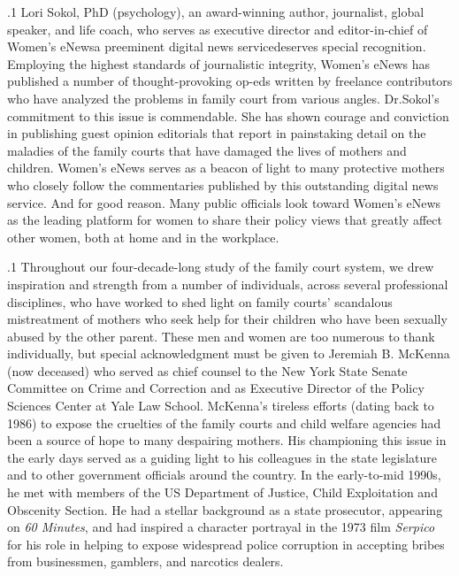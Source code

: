 \documentclass[11pt, twoside]{article}
\begin{document}
{\p.1{%
Lori Sokol, PhD (psychology), an award-winning author, journalist,
global speaker, and life coach, who serves as executive director
and editor-in-chief of Women’s eNews\mdash{}a preeminent digital news
service\mdash{}deserves special recognition. Employing the highest standards
of journalistic integrity, Women’s eNews has published a number of
thought-provoking op-eds written by freelance contributors who have
analyzed the problems in family court from various angles. Dr.\@ Sokol’s
commitment to this issue is commendable. She has shown courage and
conviction in publishing guest opinion editorials that report in painstaking detail on the maladies of the family courts that have damaged the
lives of mothers and children. Women’s eNews serves as a beacon of
light to many protective mothers who closely follow the commentaries
published by this outstanding digital news service. And for good reason. Many public officials look toward Women’s eNews as the leading
platform for women to share their policy views that greatly affect other
women, both at home and in the workplace.
}%

\p.1{%
Throughout our four-decade-long study of the family court
system, we drew inspiration and strength from a number of individuals, across several professional disciplines, who have worked to shed
light on family courts’ scandalous mistreatment of mothers who seek
help for their children who have been sexually abused by the other parent. These men and women are too numerous to thank individually,
but special acknowledgment must be given to Jeremiah B. McKenna
(now deceased) who served as chief counsel to the New York
State Senate Committee on Crime and Correction and as Executive Director of the Policy Sciences Center at Yale Law School. McKenna’s tireless
efforts (dating back to 1986) to expose the cruelties of the family courts
and child welfare agencies had been a source of hope to many despairing mothers. His championing this issue in the early days served as
a guiding light to his colleagues in the state legislature and to other
government officials around the country. In the early-to-mid 1990s, he
met with members of the US Department of Justice, Child Exploitation
and Obscenity Section. He had a stellar background as a state prosecutor,
appearing on \textit{60 Minutes}, and had inspired a character portrayal in the 1973 film
\textit{Serpico} for his role in helping to expose widespread police corruption in
accepting bribes from businessmen, gamblers, and narcotics dealers.
}%

}
\end{document}
